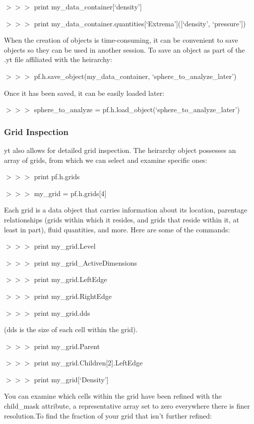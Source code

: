 {\scriptsize$>>>$} print my\_data\_container[`density']

{\scriptsize$>>>$} print my\_data\_container.quantities[`Extrema']([`density', `pressure'])

When the creation of objects is time-consuming, it can be convenient to save objects so they can be used in another session. To save an object as part of the .yt file affiliated with the heirarchy:

{\scriptsize$>>>$} pf.h.save\_object(my\_data\_container, `sphere\_to\_analyze\_later')

Once it has been saved, it can be easily loaded later:

{\scriptsize$>>>$} sphere\_to\_analyze = pf.h.load\_object(`sphere\_to\_analyze\_later')

\subsubsection{Grid Inspection}

yt also allows for detailed grid inspection. The heirarchy object possesses an array of grids, from which we can select and examine specific ones:

{\scriptsize$>>>$} print pf.h.grids

{\scriptsize$>>>$} my\_grid = pf.h.grids[4]

Each grid is a data object that carries information about its location, parentage relationships (grids within which it resides, and grids that reside within it, at least in part), fluid quantities, and more. Here are some of the commands:

{\scriptsize$>>>$} print my\_grid.Level

{\scriptsize$>>>$} print my\_grid\_ActiveDimensions

{\scriptsize$>>>$} print my\_grid.LeftEdge

{\scriptsize$>>>$} print my\_grid.RightEdge

{\scriptsize$>>>$} print my\_grid.dds

(dds is the size of each cell within the grid).

{\scriptsize$>>>$} print my\_grid.Parent

{\scriptsize$>>>$} print my\_grid.Children[2].LeftEdge

{\scriptsize$>>>$} print my\_grid[`Density']

You can examine which cells within the grid have been refined with the child\_mask attribute, a representative array set to zero everywhere there is finer resolution.To find the fraction of your grid that isn't further refined:


